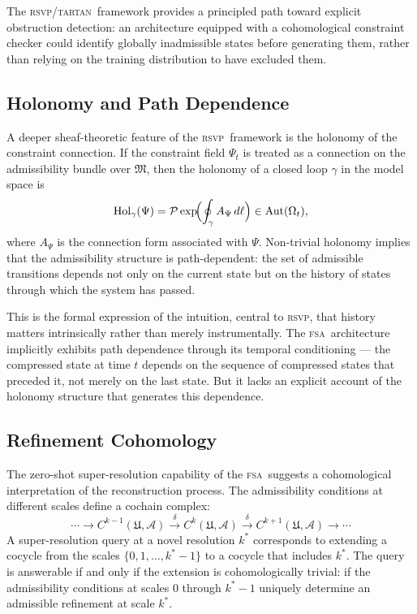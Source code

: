 \documentclass[11pt,a4paper]{article}
\theoremstyle{plain}
\theoremstyle{definition}
\theoremstyle{remark}
\newcommand{\fM}{\mathfrak{M}}
\newcommand{\RSVP}{\textup{\textsc{rsvp}}}
\newcommand{\TARTAN}{\textup{\textsc{tartan}}}
\newcommand{\FSA}{\textup{\textsc{fsa}}}
\newcommand{\Omg}{\Omega}
\newcommand{\scrA}{\mathscr{A}}
\begin{document}
The \RSVP/\TARTAN\ framework provides a principled path toward explicit
obstruction detection: an architecture equipped with a cohomological
constraint checker could identify globally inadmissible states before
generating them, rather than relying on the training distribution to
have excluded them.

\subsection{Holonomy and Path Dependence}

A deeper sheaf-theoretic feature of the \RSVP\ framework is the holonomy
of the constraint connection. If the constraint field $\Psi_t$ is treated
as a connection on the admissibility bundle over $\fM$, then the holonomy
of a closed loop $\gamma$ in the model space is
\[
\mathrm{Hol}_\gamma(\Psi) = \mathcal{P}\exp\!\Bigl(
\oint_\gamma A_\Psi \, d\ell \Bigr) \in \mathrm{Aut}(\Omg_t),
\]
where $A_\Psi$ is the connection form associated with $\Psi$. Non-trivial
holonomy implies that the admissibility structure is path-dependent: the
set of admissible transitions depends not only on the current state but on
the history of states through which the system has passed.

This is the formal expression of the intuition, central to \RSVP, that
history matters intrinsically rather than merely instrumentally. The \FSA\
architecture implicitly exhibits path dependence through its temporal
conditioning --- the compressed state at time $t$ depends on the sequence
of compressed states that preceded it, not merely on the last state. But
it lacks an explicit account of the holonomy structure that generates this
dependence.

\subsection{Refinement Cohomology}

The zero-shot super-resolution capability of the \FSA\ suggests a
cohomological interpretation of the reconstruction process. The
admissibility conditions at different scales define a cochain complex:
\[
\cdots \to C^{k-1}(\mathfrak{U}, \scrA) \xrightarrow{\delta}
C^k(\mathfrak{U}, \scrA) \xrightarrow{\delta} C^{k+1}(\mathfrak{U}, \scrA) \to \cdots
\]
A super-resolution query at a novel resolution $k^*$ corresponds to
extending a cocycle from the scales $\{0, 1, \ldots, k^*-1\}$ to a cocycle
that includes $k^*$. The query is answerable if and only if the extension
is cohomologically trivial: if the admissibility conditions at scales
$0$ through $k^*-1$ uniquely determine an admissible refinement at scale
$k^*$.
\end{document}
